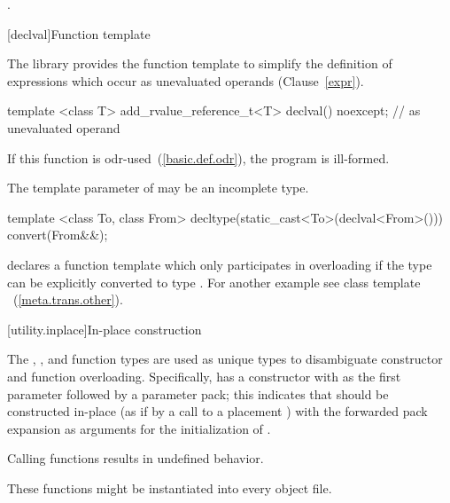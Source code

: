 \begin{itemdescr}
\pnum
\returns {}.
\end{itemdescr}

[declval]{Function template }

\pnum
The library provides the function template  to simplify the definition of
expressions which occur as unevaluated operands (Clause~\ref{expr}).

%
\begin{itemdecl}
template <class T>
  add_rvalue_reference_t<T> declval() noexcept;  // as unevaluated operand
\end{itemdecl}

\begin{itemdescr}
\pnum
\remarks If this function is odr-used~(\ref{basic.def.odr}), the program is ill-formed.

\pnum
\remarks The template parameter  of  may be an incomplete type.
\end{itemdescr}

\pnum
\begin{example}
\begin{codeblock}
template <class To, class From>
  decltype(static_cast<To>(declval<From>())) convert(From&&);
\end{codeblock}
declares a function template  which only participates in overloading if the
type  can be explicitly converted to type . For another example see class
template ~(\ref{meta.trans.other}).
\end{example}

[utility.inplace]{In-place construction}

\pnum
The , , and 
function types are used as unique types to disambiguate constructor and function
overloading. Specifically,  has a constructor with 
as the first parameter followed by a parameter pack; this indicates that 
should be constructed in-place (as if by a call to a placement )
with the forwarded pack expansion as arguments for the initialization of .

\pnum
\remarks
Calling  functions results in undefined behavior.
\begin{note} These functions might be instantiated into every object file.  \end{note}

